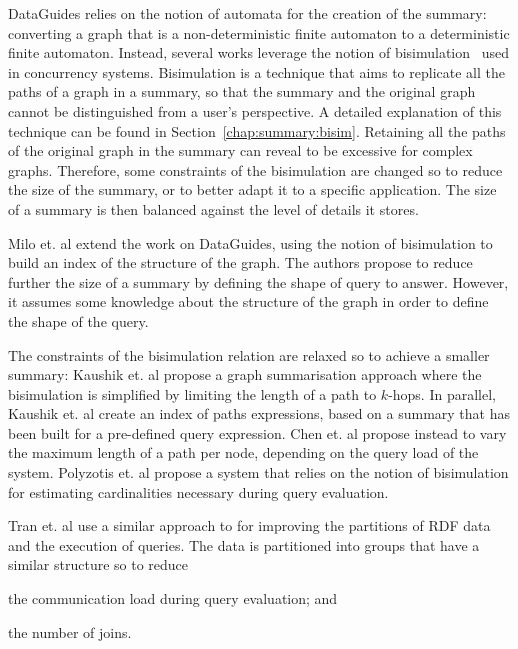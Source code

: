 DataGuides relies on the notion of automata for the creation of the summary: converting a graph that is a non-deterministic finite automaton to a deterministic finite automaton. Instead, several works leverage the notion of bisimulation~\cite{park:1981:cai} used in concurrency systems.
Bisimulation is a technique that aims to replicate all the paths of a graph in a summary, so that the summary and the original graph cannot be distinguished from a user's perspective. A detailed explanation of this technique can be found in Section~\ref{chap:summary:bisim}.
Retaining all the paths of the original graph in the summary can reveal to be excessive for complex graphs. Therefore, some constraints of the bisimulation are changed so to reduce the size of the summary, or to better adapt it to a specific application. The size of a summary is then balanced against the level of details it stores.

Milo et. al \cite{Milo:1999:ISP:645503.656266} extend the work on DataGuides, using the notion of bisimulation to build an index of the structure of the graph. The authors propose to reduce further the size of a summary by defining the shape of query to answer. However, it assumes some knowledge about the structure of the graph in order to define the shape of the query.

The constraints of the bisimulation relation are relaxed so to achieve a smaller summary: Kaushik et. al \cite{kaushik:de:2002} propose a graph summarisation approach where the bisimulation is simplified by limiting the length of a path to $k$-hops. In parallel, Kaushik et. al \cite{kaushik:2002:cib} create an index of paths expressions, based on a summary that has been built for a pre-defined query expression.
Chen et. al \cite{chen:2003:dia} propose instead to vary the maximum length of a path per node, depending on the query load of the system. Polyzotis et. al \cite{polyzotis:2006:xsx} propose a system that relies on the notion of bisimulation for estimating cardinalities necessary during query evaluation.

Tran et. al \cite{Tran:2012:kde} use a similar approach to \cite{kaushik:2002:cib} for improving the partitions of RDF data and the execution of queries. The data is partitioned into groups that have a similar structure so to reduce
\begin{inparaenum}[(a)]
\item the communication load during query evaluation; and
\item the number of joins.
\end{inparaenum}

